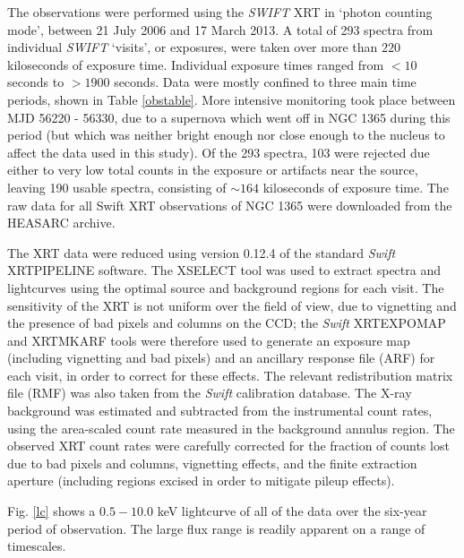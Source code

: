 \documentclass[useAMS,usenatbib]{sam}
\begin{document}
The observations were performed using the {\it SWIFT} XRT in `photon counting mode', between 21 July 2006 and 17 March 2013. A total of 293 spectra from individual {\it
SWIFT} `visits', or exposures, were taken over more than $220$ kiloseconds of exposure time. Individual exposure times ranged from $<10$ seconds to $>1900$ seconds. Data
were mostly confined to three main time periods, shown in Table \ref{obstable}. More intensive monitoring took place between MJD 56220 - 56330, due to a supernova which
went off in NGC 1365 during this period (but which was neither bright enough nor close enough to the nucleus to affect the data used in this study). Of the 293 spectra,
103 were rejected due either to very low total counts in the exposure or artifacts near the source, leaving 190 usable spectra, consisting of $\sim 164$
 kiloseconds of exposure time. The raw data for all Swift XRT observations of NGC 1365 were downloaded from the HEASARC
archive.

The XRT data were reduced using version 0.12.4 of the standard {\it Swift} XRTPIPELINE software. The XSELECT tool was used to extract spectra and lightcurves
using the optimal source and background regions for each visit. The sensitivity of the XRT is not uniform over the field of view, due to vignetting and the presence of
bad pixels and columns on the CCD; the {\it Swift} XRTEXPOMAP and XRTMKARF tools were therefore used to generate an exposure map (including vignetting and bad pixels) and
an ancillary response file (ARF) for each visit, in order to correct for these effects. The relevant redistribution matrix file (RMF) was also taken from the {\it Swift}
calibration database. The X-ray background was estimated and subtracted from the instrumental count rates, using the area-scaled count rate measured in the
background annulus region. The observed XRT count rates were carefully corrected for the fraction of counts lost due to bad pixels and columns, vignetting effects, and
the finite extraction aperture (including regions excised in order to mitigate pileup effects).




Fig. \ref{lc} shows a $0.5 - 10.0$ keV lightcurve of all of the data over the six-year period of observation. The large flux range is readily apparent on a range of
timescales.
\end{document}
